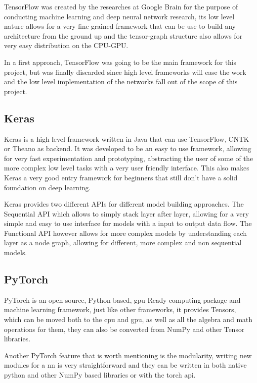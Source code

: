 TensorFlow was created by the researches at Google Brain for the purpose of conducting machine learning and deep neural network research, its low level nature allows for a very fine-grained framework that can be use to build any architecture from the ground up and the tensor-graph structure also allows for very easy distribution on the CPU-GPU.

In a first approach, TensorFlow was going to be the main framework for this project, but was finally discarded since high level frameworks will ease the work and the low level implementation of the networks fall out of the scope of this project.

\subsection{Keras}
Keras is a high level framework written in Java that can use TensorFlow, CNTK or Theano as backend. It was developed to be an easy to use framework, allowing for very fast experimentation and prototyping, abstracting the user of some of the more complex low level tasks with a very user friendly interface. This also makes Keras a very good entry framework for beginners that still don't have a solid foundation on deep learning.

Keras provides two different APIs for different model building approaches. The Sequential API which allows to simply stack layer after layer, allowing for a very simple and easy to use interface for models with a input to output data flow. The Functional API however allows for more complex models by understanding each layer as a node graph, allowing for different, more complex and non sequential models.
 
\subsection{PyTorch}
PyTorch is an open source, Python-based, \gls{gpu}-Ready computing package and machine learning framework, just like other frameworks, it provides Tensors, which can be moved both to the \gls{cpu} and \gls{gpu}, as well as all the algebra and math operations for them, they can also be converted from NumPy and other Tensor libraries.

Another PyTorch feature that is worth mentioning is the modularity, writing new modules for a \gls{nn} is very straightforward and they can be written in both native python and other NumPy based libraries or with the torch \gls{api}.

